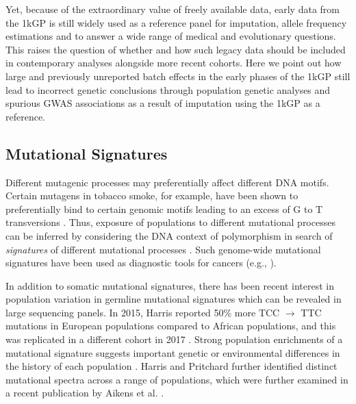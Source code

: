 \documentclass[9pt,lineno]{elife}
\begin{document}
Yet, because of the extraordinary value of freely available data, early data from the 1kGP is still widely used as a reference panel for imputation, allele frequency estimations and to answer a wide range of medical and evolutionary questions.
This raises the question of whether and how such legacy data should be included in contemporary analyses alongside more recent cohorts.
Here we point out how large and previously unreported batch effects in the early phases of the 1kGP still lead to incorrect genetic conclusions through population genetic analyses and spurious GWAS associations as a result of imputation using the 1kGP as a reference.

\subsection{Mutational Signatures}

Different mutagenic processes may preferentially affect different DNA motifs. 
Certain mutagens in tobacco smoke, for example, have been shown to preferentially bind to certain genomic motifs leading to an excess of G to T transversions \citep{Pfeifer2002,Pleasance2010}. 
Thus, exposure of populations to different mutational processes can be inferred by considering the DNA context of polymorphism in search of \textit{signatures} of different mutational processes \citep{Alexandrov2013,Shiraishi2015a}. 
Such genome-wide mutational signatures have been used as diagnostic tools for cancers (e.g., \cite{Alexandrov2013,Shiraishi2015a}).

In addition to somatic mutational signatures, there has been recent interest in population variation in germline mutational signatures which can be revealed in large sequencing panels. 
In 2015, Harris reported 50\% more TCC ${\rightarrow}$ TTC mutations in European populations compared to African populations, and this was replicated in a different cohort in 2017 \citep{Harris2015a, Harris2017a, Mathieson2017a}. 
Strong population enrichments of a mutational signature suggests important genetic or environmental differences in the history of each population \citep{Harris2015a, Harris2017a}. 
Harris and Pritchard further identified distinct mutational spectra across a range of populations, which were further examined in a recent publication by Aikens et al. \citep{Harris2017a,Aikens2018}.
 
\end{document}
